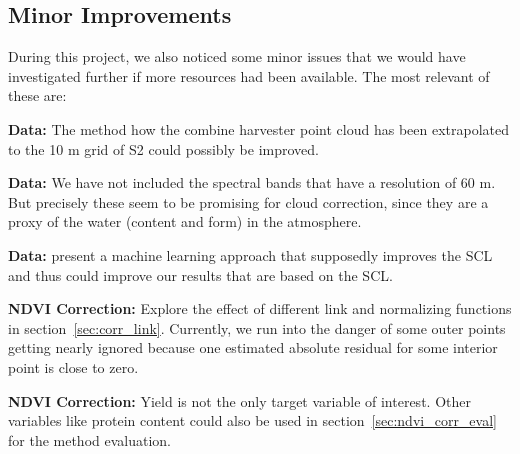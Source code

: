 {    \subsection{Minor Improvements}
        During this project, we also noticed some minor issues that we would have investigated further if more resources had been available. The most relevant of these are:
        \begin{Nitemize}
            \item \textbf{Data:}
            The method how the combine harvester point cloud has been extrapolated to the 10 m grid of S2 could possibly be improved.
            \item \textbf{Data:}
            We have not included the spectral bands that have a resolution of 60 m. But precisely these seem to be promising for cloud correction, since they are a proxy of the water (content and form) in the atmosphere.
            \item \textbf{Data:}
            \cite{raiyaniSentinel2ImageScene2021} present a machine learning approach that supposedly improves the SCL and thus could improve our results that are based on the SCL.
            \item \textbf{NDVI Correction:}
            Explore the effect of different link and normalizing functions %
            in section~\ref{sec:corr_link}. Currently, we run into the danger of some outer points getting nearly ignored because one estimated absolute residual for some interior point is close to zero.
            \item \textbf{NDVI Correction:}
            Yield is not the only target variable of interest. Other variables like protein content could also be used in section~\ref{sec:ndvi_corr_eval} for the method evaluation. 
        \end{Nitemize}
}


